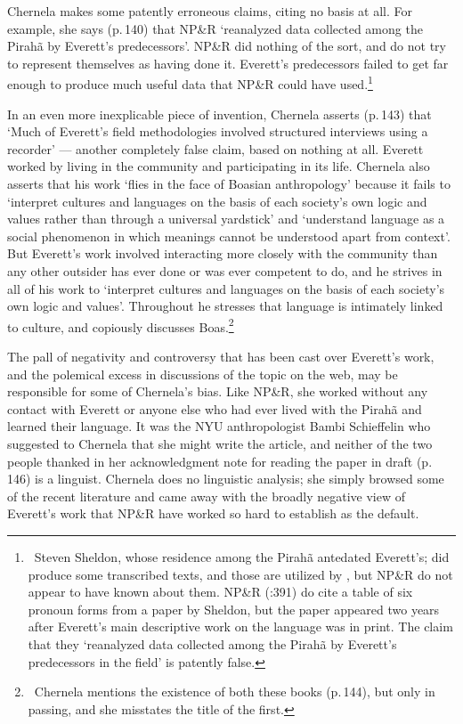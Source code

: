 \documentclass[output=paper,colorlinks,citecolor=brown
]{langscibook}
\begin{document}
Chernela makes some patently erroneous claims, citing no basis at all.
For example, she says (p.\,140) that NP\&R `reanalyzed data collected
among the Pirah{\~a} by Everett's predecessors'. NP\&R did nothing of
the sort, and do not try to represent themselves as having done it.
Everett's predecessors failed to get far enough to produce much
useful data that NP\&R could have used.\footnote{\,
   Steven Sheldon, whose residence among the Pirah{\~a} antedated
   Everett's; did produce some transcribed texts, and those are
   utilized by \citet{FutrellEtAl16}, but NP\&R do not appear to have
   known about them. NP\&R (\citeyear{NevPesRod09a}:391) do cite a
   table of six pronoun forms from a paper by Sheldon, but the paper
   \citep{Sheldon88} appeared two years after Everett's main
   descriptive work on the language was in print. The claim that they
   `reanalyzed data collected among the Pirah{\~a} by Everett's
   predecessors in the field' is patently false.}

In an even more inexplicable piece of invention, Chernela asserts
(p.\,143) that `Much of Everett's field methodologies involved
structured interviews using a recorder' --- another completely false
claim, based on nothing at all. Everett worked by living in the
community and participating in its life. Chernela also asserts that
his work `flies in the face of Boasian anthropology' because it fails
to `interpret cultures and languages on the basis of each society's
own logic and values rather than through a universal yardstick' and
`understand language as a social phenomenon in which meanings cannot
be understood apart from context'. But Everett's work involved
interacting more closely with the community than any other outsider
has ever done or was ever competent to do, and he strives in all of
his work to `interpret cultures and languages on the basis of each
society's own logic and values'. Throughout \citet{Everett12} he
stresses that language is intimately linked to culture, and
\citet{Everett16} copiously discusses Boas.\footnote{\,
   Chernela mentions the existence of both these books (p.\,144), but
   only in passing, and she misstates the title of the first.}

The pall of negativity and controversy that has been cast over
Everett's work, and the polemical excess in discussions of the topic
on the web, may be responsible for some of Chernela's bias. Like
NP\&R, she worked without any contact with Everett or anyone else
who had ever lived with the Pirah{\~a} and learned their language.
It was the NYU anthropologist Bambi Schieffelin who suggested to
Chernela that she might write the article, and neither of the two
people thanked in her acknowledgment note for reading the paper in
draft (p.\,146) is a linguist. Chernela does no linguistic analysis;
she simply browsed some of the recent literature and came away with
the broadly negative view of Everett's work that NP\&R have worked
so hard to establish as the default.
\end{document}

